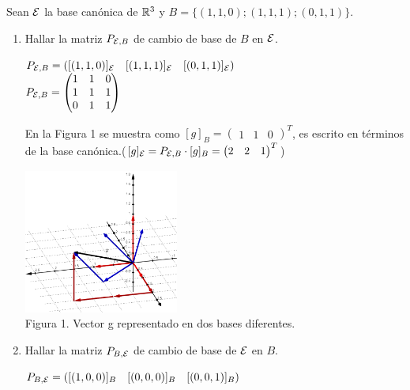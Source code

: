 \item Sean $\mathcal{E}$ la base canónica de $\mathbb{R}^3$ y $B=\{(1,1,0);(1,1,1);(0,1,1)\}$.
    \begin{enumerate}
        \item Hallar la matriz $P_{\mathcal{E},B}$ de cambio de base de $B$ en $\mathcal{E}$.
            \begin{mdframed}[style=s]
                \begin{center}
                    $P_{\mathcal{E},B}=\left([(1,1,0)]_{\mathcal{E}}\quad[(1,1,1)]_{\mathcal{E}}\quad[(0,1,1)]_{\mathcal{E}}\right)$\\
                    $P_{\mathcal{E},B}=\begin{pmatrix}
                        1&1&0\\1&1&1\\0&1&1
                    \end{pmatrix}$
                \end{center}
                En la Figura 1 se muestra como $[g]_B=\begin{pmatrix}
                    1&1&0
                \end{pmatrix}^T$, es escrito en términos de la base canónica.($[g]_{\mathcal{E}}=P_{\mathcal{E},B}\cdot[g]_B=\begin{pmatrix}
                    2&2&1
                \end{pmatrix}^T$)
                \begin{center}
                    \includegraphics[width=0.4\textwidth]{img/Ej2a.png}\\
                    Figura 1. Vector g representado en dos bases diferentes.
                \end{center}
            \end{mdframed}
        \item Hallar la matriz $P_{B,\mathcal{E}}$ de cambio de base de $\mathcal{E}$ en $B$.
            \begin{mdframed}[style=s]
                \begin{center}
                    $P_{B,\mathcal{E}}=\left([(1,0,0)]_B\quad[(0,0,0)]_B\quad[(0,0,1)]_B\right)$\\

\end{center}
\end{mdframed}
\end{enumerate}
